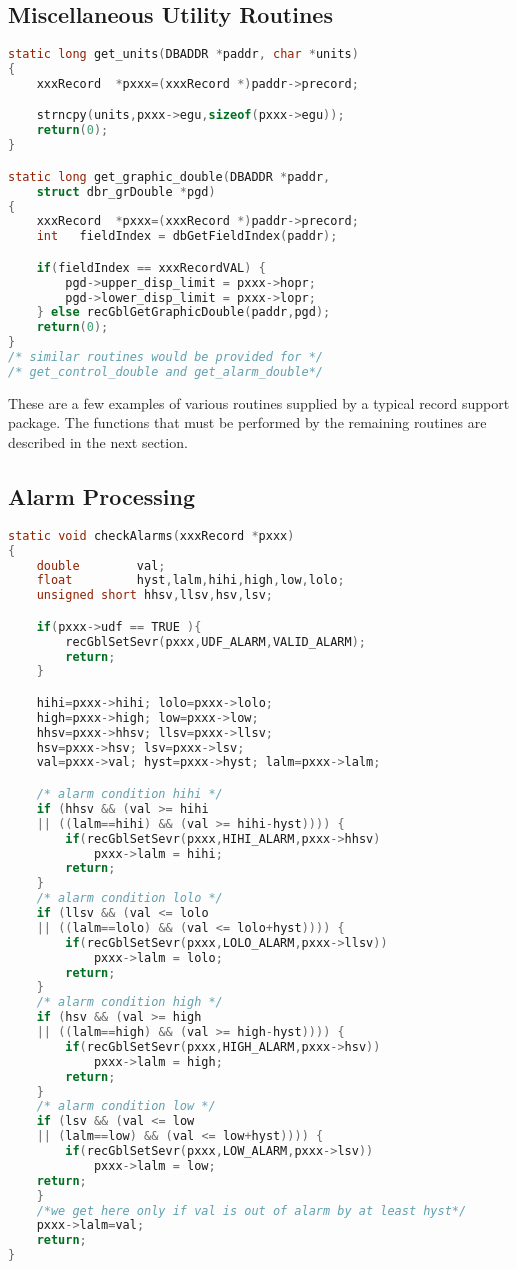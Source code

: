 \subsection{Miscellaneous Utility Routines}

\begin{lstlisting}[language=C]
static long get_units(DBADDR *paddr, char *units)
{
    xxxRecord  *pxxx=(xxxRecord *)paddr->precord;

    strncpy(units,pxxx->egu,sizeof(pxxx->egu));
    return(0);
}

static long get_graphic_double(DBADDR *paddr,
    struct dbr_grDouble *pgd)
{
    xxxRecord  *pxxx=(xxxRecord *)paddr->precord;
    int   fieldIndex = dbGetFieldIndex(paddr);

    if(fieldIndex == xxxRecordVAL) {
        pgd->upper_disp_limit = pxxx->hopr;
        pgd->lower_disp_limit = pxxx->lopr;
    } else recGblGetGraphicDouble(paddr,pgd);
    return(0);
}
/* similar routines would be provided for */
/* get_control_double and get_alarm_double*/
\end{lstlisting}

These are a few examples of various routines supplied by a typical record support package.
The functions that must be performed by the remaining routines are described in the next section.

\subsection{Alarm Processing}

\begin{lstlisting}[language=C]
static void checkAlarms(xxxRecord *pxxx)
{
    double        val;
    float         hyst,lalm,hihi,high,low,lolo;
    unsigned short hhsv,llsv,hsv,lsv;

    if(pxxx->udf == TRUE ){
        recGblSetSevr(pxxx,UDF_ALARM,VALID_ALARM);
        return;
    }

    hihi=pxxx->hihi; lolo=pxxx->lolo;
    high=pxxx->high; low=pxxx->low;
    hhsv=pxxx->hhsv; llsv=pxxx->llsv;
    hsv=pxxx->hsv; lsv=pxxx->lsv;
    val=pxxx->val; hyst=pxxx->hyst; lalm=pxxx->lalm;

    /* alarm condition hihi */
    if (hhsv && (val >= hihi 
    || ((lalm==hihi) && (val >= hihi-hyst)))) {
        if(recGblSetSevr(pxxx,HIHI_ALARM,pxxx->hhsv)
            pxxx->lalm = hihi;
        return;
    }
    /* alarm condition lolo */
    if (llsv && (val <= lolo 
    || ((lalm==lolo) && (val <= lolo+hyst)))) {
        if(recGblSetSevr(pxxx,LOLO_ALARM,pxxx->llsv))
            pxxx->lalm = lolo;
        return;
    }
    /* alarm condition high */
    if (hsv && (val >= high 
    || ((lalm==high) && (val >= high-hyst)))) {
        if(recGblSetSevr(pxxx,HIGH_ALARM,pxxx->hsv))
            pxxx->lalm = high;
        return;
    }
    /* alarm condition low */
    if (lsv && (val <= low 
    || (lalm==low) && (val <= low+hyst)))) {
        if(recGblSetSevr(pxxx,LOW_ALARM,pxxx->lsv))
            pxxx->lalm = low;
    return;
    }
    /*we get here only if val is out of alarm by at least hyst*/
    pxxx->lalm=val;
    return;
}
\end{lstlisting}

